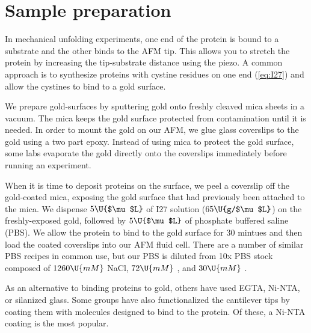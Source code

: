 \section{Sample preparation}
\label{sec:sample-preparation}

In mechanical unfolding experiments, one end of the protein is bound
to a substrate and the other binds to the AFM tip.  This allows you to
stretch the protein by increasing the tip-substrate distance using the
piezo.  A common approach is to synthesize proteins with cystine
residues on one end (\cref{eq:I27}) and allow the cystines to bind to
a gold surface\citep{carrion-vazquez99b,carrion-vazquez00,ulman96}.

We prepare gold-surfaces by sputtering gold onto freshly cleaved mica
sheets in a vacuum.  The mica keeps the gold surface protected from
contamination until it is needed.  In order to mount the gold on our
AFM, we glue glass coverslips to the gold using a two part epoxy. %
Instead of using mica to protect the gold surface, some labs
evaporate the gold directly onto the coverslips immediately before
running an experiment\citep{carrion-vazquez99b}.

When it is time to deposit proteins on the surface, we peel a
coverslip off the gold-coated mica, exposing the gold surface that had
previously been attached to the mica.  We dispense $5\U{$\mu$L}$ of
I27 solution ($65\U{g/$\mu$L}$) on the freshly-exposed gold, followed
by $5\U{$\mu$L}$ of phosphate buffered saline (PBS).  We allow the
protein to bind to the gold surface for 30 mintues and then load the
coated coverslips into our AFM fluid cell. There are a number of
similar PBS recipes in common
use\citep{florin95,carrion-vazquez00,lo01,brockwell02}, but our PBS is
diluted from 10x PBS stock composed of $1260\U{mM}$ NaCl, $72\U{mM}$
\diNaHPO, and $30\U{mM}$ \NadiHPO\citep{chyan04}.
%

As an alternative to binding proteins to gold, others have used
EGTA\citep{kellermayer03},
Ni-NTA\citep{schmidt02,itoh04,sakaki05,berkemeier11}, or silanized
glass\citep{sundberg03,ma10}.  Some groups have also functionalized
the cantilever tips by coating them with molecules designed to bind to
the protein\citep{lee05}.  Of these, a Ni-NTA coating is the most
popular\citep{schmitt00}.
%
